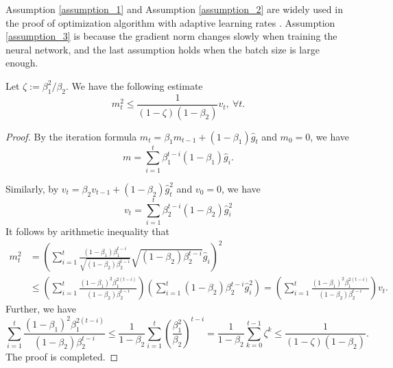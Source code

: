 \begin{remark}
    Assumption \ref{assumption_1} and Assumption \ref{assumption_2} are widely used in the proof of optimization algorithm with adaptive learning rates \cite{reddi2018convergence}. Assumption \ref{assumption_3} is because the gradient norm changes slowly when training the neural network, and the last assumption holds when the batch size is large enough.
\end{remark}


\begin{lemma}\label{lem1-001}
Let $\zeta := \beta_1^2/{\beta_2}$. We have the following estimate
\begin{equation}
m_t^2 \leq \frac{1}{(1-\zeta)(1-\beta_2)}v_t,~\forall t.
\end{equation}
\end{lemma}

\begin{proof}
By the iteration formula $m_t = \beta_1 m_{t-1} + (1-\beta_1)\hat{g}_t$ and $m_0 = 0$, we have
\begin{equation*}
m = \sum_{i=1}^t \beta_1^{t-i} (1-\beta_1)\hat{g}_i.
\end{equation*}

Similarly, by $v_t = \beta_2 v_{t-1} + (1-\beta_2) \hat{g}_t^2$ and $v_0 = 0$, we have
\begin{equation*}
v_t = \sum_{i=1}^t \beta_2^{t-i}(1-\beta_2) \hat{g}_i^2
\end{equation*}
It follows by arithmetic inequality that
\begin{equation*}
\begin{split}
m_t^2 &= \left( \sum_{i=1}^t \frac{(1-\beta_1)\beta_1^{t-i}}{\sqrt{(1-\beta_2)\beta_2^{t-i}}} \sqrt{(1-\beta_2)\beta_2^{t-i}} \hat{g}_i\right)^2 \\
&\leq \left(\sum_{i=1}^t \frac{(1 - \beta_1)^2\beta_1^{2(t-i)}}{(1-\beta_2)\beta_2^{t-i}}\right)
\left(\sum_{i=1}^t (1-\beta_2)\beta_2^{t-i}\hat{g}_i^2\right) 
= \left(\sum_{i=1}^t \frac{(1 - \beta_1)^2\beta_1^{2(t-i)}}{(1-\beta_2)\beta_2^{t-i}}\right)
v_t.
\end{split}
\end{equation*}
Further, we have
\begin{equation*}\label{1-005} 
\sum_{i=1}^t \frac{(1 - \beta_1)^2\beta_1^{2(t-i)}}{(1-\beta_2)\beta_2^{t-i}}
\leq \frac{1}{1-\beta_2}\sum_{i=1}^t \left(\frac{\beta_1^2}{\beta_2}\right)^{t-i} = \frac{1}{1-\beta_2}\sum_{k=0}^{t-1} \zeta^k 
\leq \frac{1}{(1-\zeta)(1-\beta_2)}. 
\end{equation*}
The proof is completed.
\end{proof}



